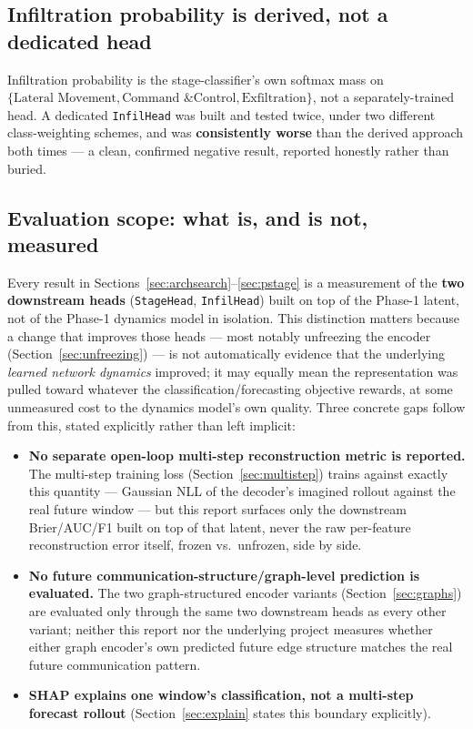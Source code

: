 \documentclass[11pt]{article}
\newcommand{\code}[1]{\texttt{#1}}
\begin{document}
\subsection{Infiltration probability is derived, not a dedicated head}

Infiltration probability is the stage-classifier's own softmax mass on
$\{\text{Lateral Movement}, \text{Command \& Control}, \text{Exfiltration}\}$, not a
separately-trained head. A dedicated \code{InfilHead} was built and tested twice, under two
different class-weighting schemes, and was \textbf{consistently worse} than the derived
approach both times --- a clean, confirmed negative result, reported honestly rather than
buried.

\subsection{Evaluation scope: what is, and is not, measured}
\label{sec:evalscope}

Every result in Sections~\ref{sec:archsearch}--\ref{sec:pstage} is a measurement of the
\textbf{two downstream heads} (\code{StageHead}, \code{InfilHead}) built on top of the Phase-1
latent, not of the Phase-1 dynamics model in isolation. This distinction matters because a
change that improves those heads --- most notably unfreezing the encoder
(Section~\ref{sec:unfreezing}) --- is not automatically evidence that the underlying
\emph{learned network dynamics} improved; it may equally mean the representation was pulled
toward whatever the classification/forecasting objective rewards, at some unmeasured cost to
the dynamics model's own quality. Three concrete gaps follow from this, stated explicitly
rather than left implicit:

\begin{itemize}[leftmargin=1.5em]
  \item \textbf{No separate open-loop multi-step reconstruction metric is reported.} The
  multi-step training loss (Section~\ref{sec:multistep}) trains against exactly this
  quantity --- Gaussian NLL of the decoder's imagined rollout against the real future window
  --- but this report surfaces only the downstream Brier/AUC/F1 built on top of that latent,
  never the raw per-feature reconstruction error itself, frozen vs.\ unfrozen, side by side.
  \item \textbf{No future communication-structure/graph-level prediction is evaluated.} The
  two graph-structured encoder variants (Section~\ref{sec:graphs}) are evaluated only through
  the same two downstream heads as every other variant; neither this report nor the underlying
  project measures whether either graph encoder's own predicted future edge structure matches
  the real future communication pattern.
  \item \textbf{SHAP explains one window's classification, not a multi-step forecast rollout}
  (Section~\ref{sec:explain} states this boundary explicitly).
\end{itemize}
\end{document}
